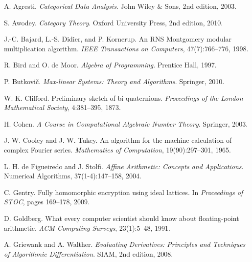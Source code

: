 \documentclass[12pt,a4paper]{article}
\theoremstyle{definition}
\begin{document}


\begin{thebibliography}{99}

A. Agresti.
\newblock \emph{Categorical Data Analysis}.
\newblock John Wiley \& Sons, 2nd edition, 2003.

S. Awodey.
\newblock \emph{Category Theory}.
\newblock Oxford University Press, 2nd edition, 2010.

J.-C. Bajard, L.-S. Didier, and P. Kornerup.
\newblock An {RNS} {Montgomery} modular multiplication algorithm.
\newblock \emph{IEEE Transactions on Computers}, 47(7):766--776, 1998.

R. Bird and O. de Moor.
\newblock \emph{Algebra of Programming}.
\newblock Prentice Hall, 1997.

P. Butkovi\v{c}.
\newblock \emph{Max-linear Systems: Theory and Algorithms}.
\newblock Springer, 2010.

W. K. Clifford.
\newblock Preliminary sketch of bi-quaternions.
\newblock \emph{Proceedings of the London Mathematical Society}, 4:381--395, 1873.

H. Cohen.
\newblock \emph{A Course in Computational Algebraic Number Theory}.
\newblock Springer, 2003.

J. W. Cooley and J. W. Tukey.
\newblock An algorithm for the machine calculation of complex {Fourier} series.
\newblock \emph{Mathematics of Computation}, 19(90):297--301, 1965.

L. H. de Figueiredo and J. Stolfi.
\newblock \emph{Affine Arithmetic: Concepts and Applications}.
\newblock Numerical Algorithms, 37(1-4):147--158, 2004.

C. Gentry.
\newblock Fully homomorphic encryption using ideal lattices.
\newblock In \emph{Proceedings of STOC}, pages 169--178, 2009.

D. Goldberg.
\newblock What every computer scientist should know about floating-point arithmetic.
\newblock \emph{ACM Computing Surveys}, 23(1):5--48, 1991.

A. Griewank and A. Walther.
\newblock \emph{Evaluating Derivatives: Principles and Techniques of Algorithmic Differentiation}.
\newblock SIAM, 2nd edition, 2008.


\end{thebibliography}
\end{document}
